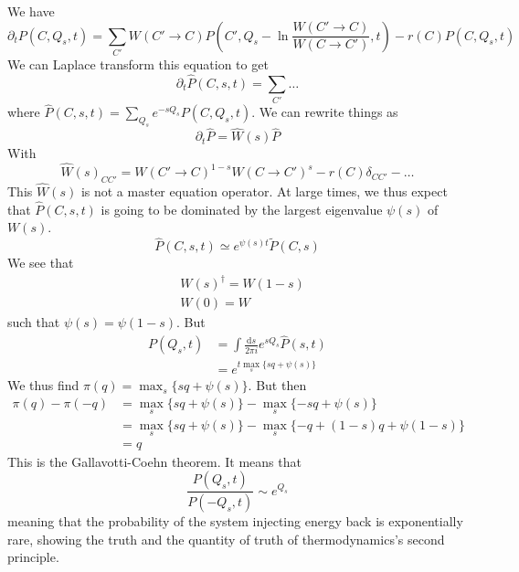 \documentclass[a4paper]{book}
\theoremstyle{definition}
\theoremstyle{remark}
\begin{document}
We have 
\begin{equation}
    \partial _t P(C, Q_s, t) = \sum_{C'} W(C' \rightarrow C) P(C', Q_s - \ln\frac{W(C' \rightarrow C)}{W(C \rightarrow C')}, t) - r(C)P(C, Q_s, t)
\end{equation}
We can Laplace transform this equation to get 
\begin{equation}
    \partial_t \hat{P}(C, s, t)= \sum_{C'} \dots 
\end{equation}
where $\hat{P}(C, s, t) = \sum_{Q_s} e^{-sQ_s}P(C, Q_s, t)$. We can rewrite things as
\begin{equation}
    \partial_t \hat{P} = \hat{W}(s)\hat{P}
\end{equation}
With 
\begin{equation}
    \hat{W}(s)_{CC'} = W(C' \rightarrow C)^{1-s}W(C \rightarrow C')^{s} - r(C)\delta_{CC'} - \dots 
\end{equation}
This $\hat{W}(s)$ is not a master equation operator. At large times, we thus expect that $\hat{P}(C, s, t)$ is going to be dominated by the largest eigenvalue $\psi(s)$ of $W(s)$. 
\begin{equation}
    \hat{P}(C, s, t) \simeq e^{\psi(s)t}\tilde{P}(C, s)
\end{equation}
We see that 
\begin{equation}
    \begin{aligned}
        &W(s)^\dagger = W(1-s) \\
        &W(0) = W
    \end{aligned}
\end{equation}
such that $\psi(s) = \psi(1-s)$. But 
\begin{equation}
    \begin{aligned}
        P(Q_s, t) &= \int \frac{\text{d}s}{2\pi i} e^{sQ_s}\hat{P}(s, t) \\ 
        &= e^{t \max_s \{sq + \psi(s)\}}
    \end{aligned}
\end{equation}
We thus find $\pi(q) = \max_s \{sq + \psi(s)\}$. But then
\begin{equation}
    \begin{aligned}
        \pi(q) - \pi(-q) &= \max_s \{sq + \psi(s)\} - \max_s \{-sq + \psi(s)\} \\ 
        &= \max_s \{sq + \psi(s)\} - \max_s \{-q + (1-s)q + \psi(1-s)\} \\ 
        &= q
    \end{aligned}
\end{equation}
This is the Gallavotti-Coehn theorem. It means that 
\begin{equation}
    \frac{P(Q_s, t)}{P(-Q_s, t)} \sim e^{Q_s}
\end{equation}
meaning that the probability of the system injecting energy back is exponentially rare, showing the truth and the quantity of truth of thermodynamics's second principle. 
\end{document}
